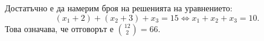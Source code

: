 \begin{hint}
\begin{enumerate}[a)]


    Достатъчно е да намерим броя на решенията на уравнението:
    \[(x_1 + 2) + (x_2 + 3) + x_3 = 15 \iff x_1 + x_2 + x_3 = 10.\]
    Това означава, че отговорът е $\binom{12}{2} = 66$.

\end{enumerate}
\end{hint}
